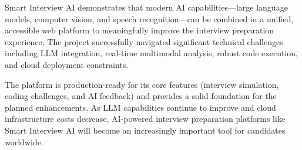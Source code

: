 Smart Interview AI demonstrates that modern AI capabilities---large language models, computer vision, and speech recognition---can be combined in a unified, accessible web platform to meaningfully improve the interview preparation experience. The project successfully navigated significant technical challenges including LLM integration, real-time multimodal analysis, robust code execution, and cloud deployment constraints.

The platform is production-ready for its core features (interview simulation, coding challenges, and AI feedback) and provides a solid foundation for the planned enhancements. As LLM capabilities continue to improve and cloud infrastructure costs decrease, AI-powered interview preparation platforms like Smart Interview AI will become an increasingly important tool for candidates worldwide.
